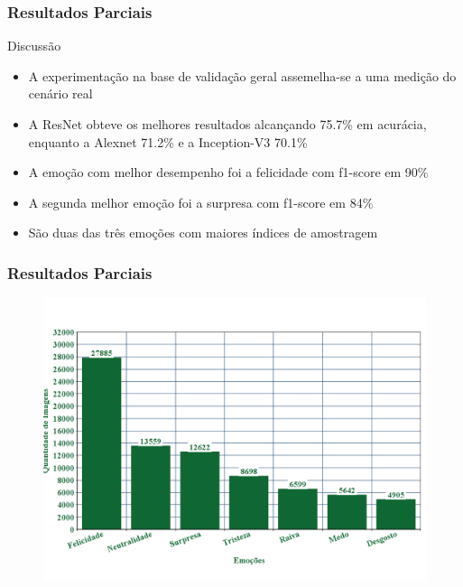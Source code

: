 \documentclass{beamer}
\begin{document}
\begin{frame}
\frametitle{Resultados Parciais}
 \begin{block}{Discussão}
\begin{itemize}
\item A experimentação na base de validação geral assemelha-se a uma medição do cenário real
\item A ResNet obteve os melhores resultados alcançando 75.7\% em acurácia, enquanto a Alexnet 71.2\% e a Inception-V3 70.1\%
\item A emoção com melhor desempenho foi a felicidade com f1-score em 90\%
\item A segunda melhor emoção foi a surpresa com f1-score em 84\%
\pause
\item São duas das três emoções com maiores índices de amostragem
\end{itemize}
\end{block}
\end{frame}


\begin{frame}
\frametitle{Resultados Parciais}
\begin{figure}
\centering
\includegraphics[scale=0.35]{figuras/grafico_emocoes.png}
\label{fig:arquitetura4}
\end{figure}
\end{frame}
\end{document}
